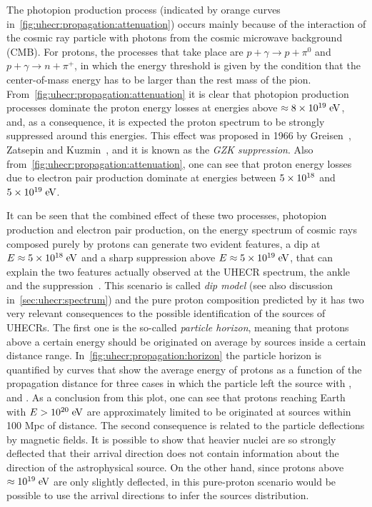 The photopion production process (indicated by orange curves in~\cref{fig:uhecr:propagation:attenuation})
occurs mainly because of the interaction of the cosmic ray particle with photons
from the cosmic microwave background (CMB). For protons, the processes that take place are
$p+\gamma\rightarrow p + \pi^0$ and $p+\gamma\rightarrow n+ \pi^+$, in which
the energy threshold is given by the condition that the center-of-mass energy 
has to be larger than the rest mass of the pion. From~\cref{fig:uhecr:propagation:attenuation} it is clear
that photopion production processes dominate the proton energy
losses at energies above $\approx 8\times\mbox{$10^{19}\;\mbox{e\kern-0.1em V}$}$,
and, as a consequence, it is expected the proton spectrum to be strongly
suppressed around this energies.
This effect was proposed in 1966 by Greisen~\cite{Greisen:1966jv},
Zatsepin and Kuzmin~\cite{Zatsepin:1966jv}, and it is known as the \emph{GZK suppression}.
Also from~\cref{fig:uhecr:propagation:attenuation}, one can see
that proton energy losses due to electron pair production
dominate at energies between $5\times\mbox{$10^{18}$}$ and
$5\times\mbox{$10^{19}\;\mbox{e\kern-0.1em V}$}$.

It can be seen that the combined effect of these two processes,
photopion production and electron pair production,
on the energy spectrum of cosmic rays composed purely by protons
can generate two evident features, a dip at $E\approx 5\times\mbox{$10^{18}\;\mbox{e\kern-0.1em V}$}$
and a sharp suppression above $E\approx 5\times\mbox{$10^{19}\;\mbox{e\kern-0.1em V}$}$, that
can explain the two features actually observed at the UHECR spectrum,
the ankle and the suppression~\cite{Berezinsky:2002nc,Berezinsky:2005cq}.
This scenario is called \emph{dip model} (see also discussion in~\cref{sec:uhecr:spectrum})
and the pure proton composition predicted by it has
two very relevant consequences to the possible identification of the sources
of UHECRs. The first one is the so-called
\emph{particle horizon}, meaning that protons above a certain energy
should be originated on average by sources inside a certain distance range.
In~\cref{fig:uhecr:propagation:horizon}
the particle horizon is quantified by curves that show the average energy
of protons as a function of the propagation distance for three cases in which the
particle left the source with ,  and . As a conclusion from this plot,
one can see that protons reaching Earth with $E>\mbox{$10^{20}\;\mbox{e\kern-0.1em V}$}$ are approximately limited to
be originated at sources within 100 Mpc of distance. The second consequence is related
to the particle deflections by magnetic fields. It is possible to show that
heavier nuclei are so strongly deflected that their arrival direction does not contain
information about the direction of the astrophysical source. On the other hand,
since protons above $\approx\mbox{$10^{19}\;\mbox{e\kern-0.1em V}$}$ are only slightly deflected, in this pure-proton
scenario would be possible to use the arrival directions to infer the sources distribution.



